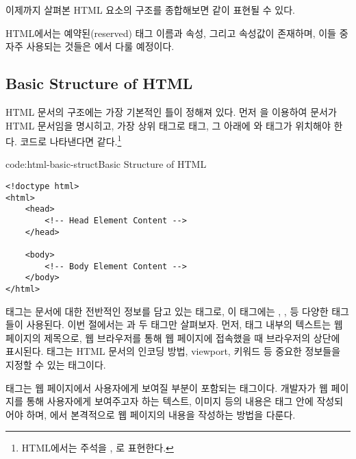 이제까지 살펴본 HTML 요소의 구조를 종합해보면 \와 같이 표현될 수 있다.

    {}

HTML에서는 예약된(reserved) 태그 이름과 속성, 그리고 속성값이 존재하며, 이들 중 자주 사용되는 것들은 에서 다룰 예정이다.

\subsection*{Basic Structure of HTML}
HTML 문서의 구조에는 가장 기본적인 틀이 정해져 있다. 먼저 을 이용하여 문서가 HTML 문서임을 명시히고, 가장 상위 태그로  태그, 그 아래에 와  태그가 위치해야 한다. 코드로 나타낸다면 \와 같다.\footnote{HTML에서는 주석을 \cd{<!--}, \cd{-->}로 표현한다.}

\begin{codeenv}{code:html-basic-struct}{Basic Structure of HTML}
\begin{verbatim}
<!doctype html>
<html>
    <head>
        <!-- Head Element Content -->
    </head>

    <body>
        <!-- Body Element Content -->
    </body>
</html>
\end{verbatim}
\end{codeenv}

 태그는 문서에 대한 전반적인 정보를 담고 있는 태그로, 이 태그에는 , ,  등 다양한 태그들이 사용된다. 이번 절에서는 과  두 태그만 살펴보자. 먼저,  태그 내부의 텍스트는 웹 페이지의 제목으로, 웹 브라우저를 통해 웹 페이지에 접속했을 때 브라우저의 상단에 표시된다.  태그는 HTML 문서의 인코딩 방법, viewport, 키워드 등 중요한 정보들을 지정할 수 있는 태그이다.

 태그는 웹 페이지에서 사용자에게 보여질 부분이 포함되는 태그이다. 개발자가 웹 페이지를 통해 사용자에게 보여주고자 하는 텍스트, 이미지 등의 내용은  태그 안에 작성되어야 하며, 에서 본격적으로 웹 페이지의 내용을 작성하는 방법을 다룬다.
